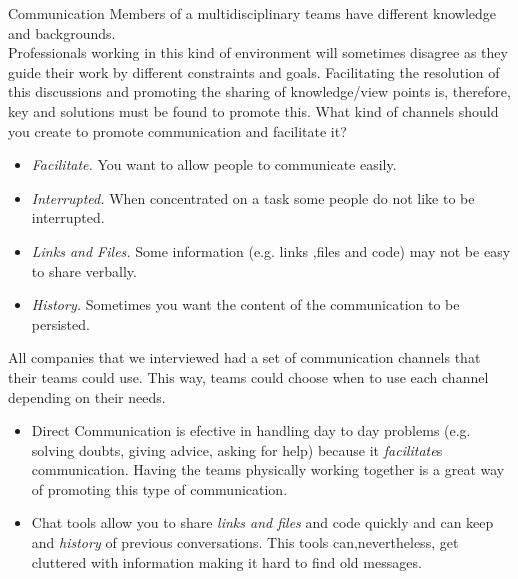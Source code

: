 

















\begin{pattern}{Communication} \label{chap:patterns:pattern:commuication}
        \context
        Members of a multidisciplinary teams have different knowledge and backgrounds. \\
        Professionals working in this kind of environment will sometimes disagree as they guide their work by different constraints and goals. Facilitating the resolution of this discussions and promoting the sharing of knowledge/view points is, therefore, key and solutions must be found to promote this.
        \problem
        What kind of channels should you create to promote communication and facilitate it?
        \forces
            \begin{itemize}
                \item \textit{Facilitate.} You want to allow people to communicate easily.
                \item \textit{Interrupted.} When concentrated on a task some people do not like to be interrupted.
                \item \textit{Links and Files.} Some information (e.g. links ,files and code) may not be easy to share verbally.
                \item \textit{History.} Sometimes you want the content of the communication to be persisted.
            \end{itemize}
        \solution
        All companies that we interviewed had a set of communication channels that their teams could use. This way, teams could choose when to use each channel depending on their needs.
        \begin{itemize}
            \item Direct Communication is efective in handling day to day problems (e.g. solving doubts, giving advice, asking for help) because it \textit{facilitate}s communication. Having the teams physically working together is a great way of promoting this type of communication.
            \item Chat tools allow you to share \textit{links and files} and code quickly and can keep and \textit{history} of previous conversations. This tools can,nevertheless, get cluttered with information making it hard to find old messages. \\

\end{itemize}
\end{pattern}
